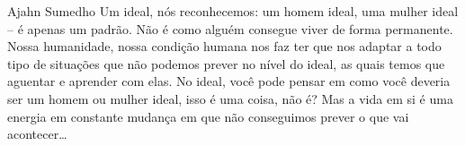 
\begin{quotepage}{0.6\linewidth}{Ajahn Sumedho}
Um ideal, nós reconhecemos: um homem ideal, uma mulher ideal – é apenas
um padrão. Não é como alguém consegue viver de forma permanente. Nossa
humanidade, nossa condição humana nos faz ter que nos adaptar a todo
tipo de situações que não podemos prever no nível do ideal, as quais
temos que aguentar e aprender com elas. No ideal, você pode pensar em
como você deveria ser um homem ou mulher ideal, isso é uma coisa, não
é? Mas a vida em si é uma energia em constante mudança em que não
conseguimos prever o que vai acontecer…
\end{quotepage}

